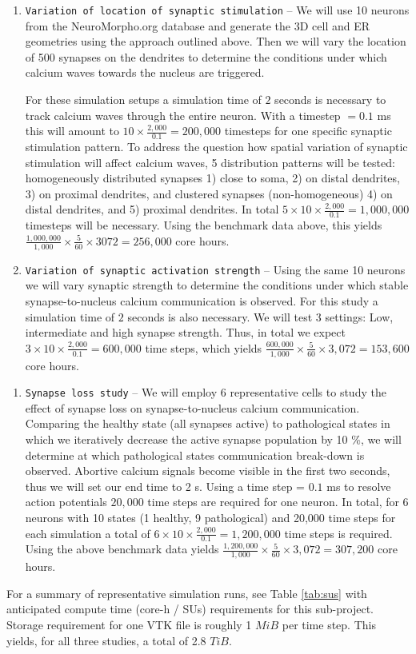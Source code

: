 \begin{enumerate}
\item \texttt{Variation of location of synaptic stimulation} -- We will use 10 neurons from the NeuroMorpho.org database and generate the 3D cell and ER geometries using the approach outlined above. Then we will vary the location of 500 synapses on the dendrites to determine the conditions under which calcium waves towards the nucleus are triggered. 

For these simulation setups a simulation time of $2$ seconds is necessary
to track calcium waves through the entire neuron. With a timestep $= 0.1$ ms this will amount to $10 \times \frac{2,000}{0.1} = 200,000$ timesteps for one specific synaptic stimulation pattern. To address the question how spatial variation of synaptic stimulation will affect calcium waves, 5 distribution patterns will be tested: homogeneously distributed synapses 1) close to soma, 2) on distal dendrites, 3) on proximal dendrites, and clustered synapses (non-homogeneous) 4) on distal dendrites, and 5) proximal dendrites. In total
$5 \times 10 \times \frac{2,000}{0.1} = 1,000,000$ timesteps will be necessary. Using the benchmark data above, this yields $\frac{1,000,000}{1,000} \times \frac{5}{60} \times 3072 = 256,000$ core hours.

\item \texttt{Variation of synaptic activation strength} -- Using the same 10 neurons we will vary synaptic strength to determine the conditions under which stable synapse-to-nucleus calcium communication is observed. 
For this study a simulation time of $2$ seconds is also necessary. We will test 3 settings: Low, intermediate and high synapse strength. Thus, in total we expect $3 \times 10 \times \frac{2,000}{0.1} = 600,000$ time steps, which yields $\frac{600,000}{1,000} \times \frac{5}{60} \times 3,072 = 153,600$ core hours.
\end{enumerate}
\begin{enumerate}[resume]
\item \texttt{Synapse loss study} -- We will employ 6 representative cells to study the effect of synapse loss on synapse-to-nucleus calcium communication. Comparing the healthy state (all synapses active) to pathological states in which we iteratively decrease the active synapse population by 10 \%, we will determine at which pathological states communication break-down is observed. 
Abortive calcium signals become visible in the first two seconds, thus we will set our end time to 2 s. Using a time step = $0.1$ ms to
resolve action potentials $20,000$ time steps are required for one neuron. In total, for 6 neurons with 10 states (1 healthy, 9 pathological) and 20,000 time steps for each simulation a total of $6 \times 10 \times \frac{2,000}{0.1} = 1,200,000$ time steps is required. Using the above benchmark data yields $\frac{1,200,000}{1,000} \times \frac{5}{60} \times 3,072 = 307,200$ core hours.
\end{enumerate}
For a summary of representative simulation runs, see Table \ref{tab:sus} with 
anticipated compute time (core-h / SUs) requirements for this sub-project. Storage requirement for one VTK file is roughly 1 $MiB$ per time step. This yields, for all three studies, a total of 2.8 $TiB$.  


